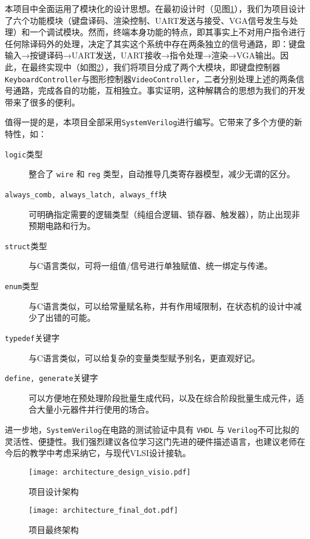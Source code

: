 本项目中全面运用了模块化的设计思想。在最初设计时（见图\ref{fig:design_architecture}），我们为项目设计了六个功能模块（键盘译码、渲染控制、UART发送与接受、VGA信号发生与处理）和一个调试模块。然而，终端本身功能的特点，即其事实上不对用户指令进行任何除译码外的处理，决定了其实这个系统中存在两条独立的信号通路，即：键盘输入→按键译码→UART发送，UART接收→指令处理→渲染→VGA输出。因此，在最终实现中（如图\ref{fig:final_architecture}），我们将项目分成了两个大模块，即键盘控制器\texttt{KeyboardController}与图形控制器\texttt{VideoController}，二者分别处理上述的两条信号通路，完成各自的功能，互相独立。事实证明，这种解耦合的思想为我们的开发带来了很多的便利。

值得一提的是，本项目全部采用\texttt{SystemVerilog}进行编写。它带来了多个方便的新特性，如：
\begin{description}
  \item[\texttt{logic}类型] 整合了 \texttt{wire} 和 \texttt{reg} 类型，自动推导几类寄存器模型，减少无谓的区分。
  \item[\texttt{always\_comb, always\_latch, always\_ff}块] 可明确指定需要的逻辑类型（纯组合逻辑、锁存器、触发器），防止出现非预期电路和行为。
  \item[\texttt{struct}类型] 与C语言类似，可将一组值/信号进行单独赋值、统一绑定与传递。
  \item[\texttt{enum}类型] 与C语言类似，可以给常量赋名称，并有作用域限制，在状态机的设计中减少了出错的可能。
  \item[\texttt{typedef}关键字] 与C语言类似，可以给复杂的变量类型赋予别名，更直观好记。
  \item[\texttt{define, generate}关键字] 可以方便地在预处理阶段批量生成代码，以及在综合阶段批量生成元件，适合大量小元器件并行使用的场合。
\end{description}

进一步地，\texttt{SystemVerilog}在电路的测试验证中具有 \texttt{VHDL} 与 \texttt{Verilog}不可比拟的灵活性、便捷性。我们强烈建议各位学习这门先进的硬件描述语言，也建议老师在今后的教学中考虑采纳它，与现代VLSI设计接轨。

\begin{figure}[htbp]
\centerline{
\texttt{[image: architecture\_design\_visio.pdf]}
}
\label{fig:design_architecture}
\caption{项目设计架构}
\end{figure}

\begin{figure}[htbp]
\centerline{
\texttt{[image: architecture\_final\_dot.pdf]}
}
\label{fig:final_architecture}
\caption{项目最终架构}
\end{figure}
